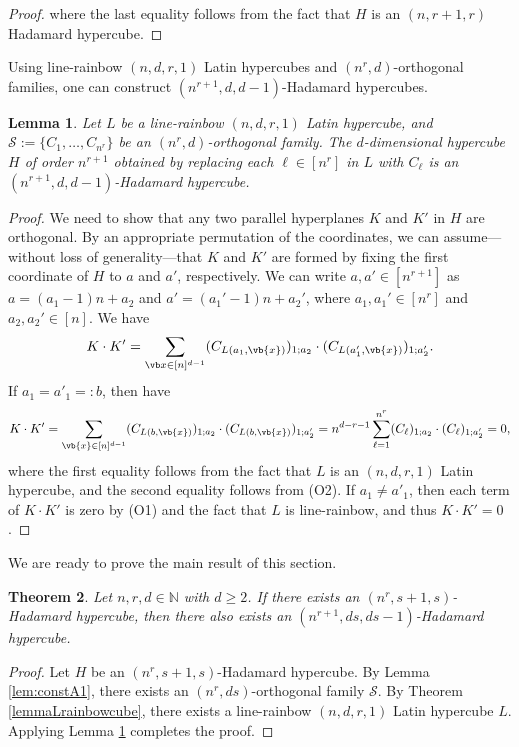 \documentclass[11pt,oneside]{amsart}
\newtheorem{theorem}{Theorem}[section]
\newtheorem{lemma}[theorem]{Lemma}
\begin{document}
{\begin{proof}
     where the last equality follows from the fact that $H$ is an $(n,r+1,r)$ Hadamard hypercube. 
\end{proof}
Using line-rainbow   $(n,d,r,1)$ Latin hypercubes and $(n^r,d)$-orthogonal  families, one can construct $(n^{r+1},d,d-1)$-Hadamard hypercubes.
\begin{lemma}\label{lem:consthcube}
    Let $L$ be a line-rainbow $(n,d,r,1)$ Latin hypercube, and $\mathcal S:=\{C_1,\dots,C_{n^r}\}$ be an $(n^r,d)$-orthogonal family.    
 The $d$-dimensional hypercube $H$ of order $n^{r+1}$ obtained by replacing each $\ell\in [n^r]$ in $L$ with $C_\ell$ is an $(n^{r+1},d,d-1)$-Hadamard hypercube. 
\end{lemma}
\begin{proof}
    We need to show that any two parallel hyperplanes $K$ and $K'$ in $H$ are orthogonal. By an appropriate permutation of the coordinates, we can assume—without loss of generality—that $K$ and $K'$ are formed by fixing the first coordinate of $H$ to $a$ and $a'$, respectively.  We can write $a,a'\in [n^{r+1}]$ as $a = (a_1-1)n + a_2$ and $a' = (a_1'-1)n + a_2'$, where $a_1, a_1' \in [n^r]$ and $a_2, a_2' \in [n]$.  
  We have  
    \begin{align*}%
    K \cdot K'=\sum_{{\vb x}\in[n]^{d-1}} (C_{L(a_1, \vb{x})})_{1;a_2}\cdot  (C_{L(a'_1, \vb{x})})_{1;a'_2}. 
    \end{align*}
  If $a_1=a'_1=:b$, then have 
    \begin{align*}
        K \cdot K'=\sum_{\vb{x}\in[n]^{d-1}} (C_{L(b,\vb{x})})_{1;a_2}\cdot  (C_{L(b,\vb{x})})_{1;a'_2}=n^{d-r-1}\sum_{\ell=1}^{n^r}  (C_{\ell})_{1;a_2}\cdot (C_{\ell})_{1;a'_2}=0, 
    \end{align*}
    where the first equality follows from the fact that $L$ is an $(n,d,r,1)$ Latin hypercube, and the second equality follows from (O2). If $a_1\neq a'_1$,  then each term of $K\cdot K'$ is zero by (O1) and the fact that $L$ is line-rainbow, and thus $K\cdot K'=0$.  
\end{proof}

We are ready to prove the main result of this section. 
\begin{theorem}\label{thm:hypercube} 
       Let $n, r, d \in \mathbb{N}$ with $d \geq 2$. If there exists an $(n^r, s+1, s)$-Hadamard hypercube, then there also exists an $(n^{r+1}, ds, ds-1)$-Hadamard hypercube. 
\end{theorem}
\begin{proof}
Let $H$ be an  $(n^r,s+1,s)$-Hadamard hypercube. By Lemma \ref{lem:constA1}, there exists an $(n^r, ds)$-orthogonal family $\mathcal S$. By Theorem \ref{lemmaLrainbowcube}, there exists  a line-rainbow $(n,d,r,1)$ Latin hypercube $L$. Applying Lemma \ref{lem:consthcube} completes the proof. 
\end{proof}

}
\end{document}
